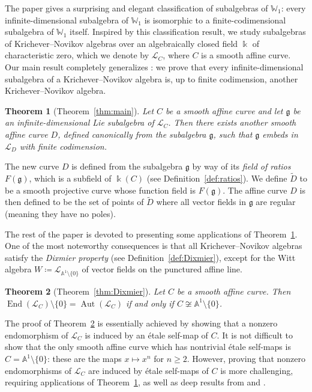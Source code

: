 \documentclass[12pt]{amsart}
\theoremstyle{plain}
\newtheorem{theorem}{Theorem}[section]
\theoremstyle{definition}
\numberwithin{equation}{section}
\def\g{\mathfrak{g}}
\def\L{\mathcal{L}}
\def\Aa{\mathbb{A}}
\def\WW{\mathbb{W}}
\def\kk{\Bbbk}
\DeclareMathOperator{\End}{End}
\DeclareMathOperator{\Aut}{Aut}
\def\nonzero{\setminus \{0\}}
\begin{document}
The paper \cite{BellBuzaglo} gives a surprising and elegant classification of subalgebras of $\WW_1$: every infinite-dimensional subalgebra of $\WW_1$ is isomorphic to a finite-codimensional subalgebra of $\WW_1$ itself. Inspired by this classification result, we study subalgebras of Krichever--Novikov algebras over an algebraically closed field $\kk$ of characteristic zero, which we denote by $\L_C$, where $C$ is a smooth affine curve. Our main result completely generalizes \cite[Corollary 4.1]{BellBuzaglo}: we prove that every infinite-dimensional subalgebra of a Krichever--Novikov algebra is, up to finite codimension, another Krichever--Novikov algebra.

\begin{theorem}[Theorem~\ref{thm:main}]\label{thm:intro main}
    Let $C$ be a smooth affine curve and let $\g$ be an infinite-dimensional Lie subalgebra of $\L_C$. Then there exists another smooth affine curve $D$, defined canonically from the subalgebra $\g$, such that $\g$ embeds in $\L_D$ with finite codimension.
\end{theorem}

The new curve $D$ is defined from the subalgebra $\g$ by way of its \emph{field of ratios} $F(\g)$, which is a subfield of $\kk(C)$ (see Definition~\ref{def:ratios}). We define $\widetilde{D}$ to be a smooth projective curve whose function field is $F(\g)$. The affine curve $D$ is then defined to be the set of points of $\widetilde{D}$ where all vector fields in $\g$ are regular (meaning they have no poles).

The rest of the paper is devoted to presenting some applications of Theorem~\ref{thm:intro main}. One of the most noteworthy consequences is that all Krichever--Novikov algebras satisfy the \emph{Dixmier property} (see Definition~\ref{def:Dixmier}), except for the Witt algebra $W \coloneqq \L_{\Aa^1 \nonzero}$ of vector fields on the punctured affine line.

\begin{theorem}[Theorem~\ref{thm:Dixmier}]\label{thm:intro Dixmier}
    Let $C$ be a smooth affine curve. Then $\End(\L_C) \nonzero = \Aut(\L_C)$ if and only if $C \not\cong \Aa^1 \nonzero$.
\end{theorem}

The proof of Theorem~\ref{thm:intro Dixmier} is essentially achieved by showing that a nonzero endomorphism of $\L_C$ is induced by an \'etale self-map of $C$. It is not difficult to show that the only smooth affine curve which has nontrivial \'etale self-maps is $C = \Aa^1 \nonzero$: these are the maps $x \mapsto x^n$ for $n \geq 2$. However, proving that nonzero endomorphisms of $\L_C$ are induced by \'etale self-maps of $C$ is more challenging, requiring applications of Theorem~\ref{thm:intro main}, as well as deep results from \cite{Grabowski} and \cite{Siebert}.
\end{document}
